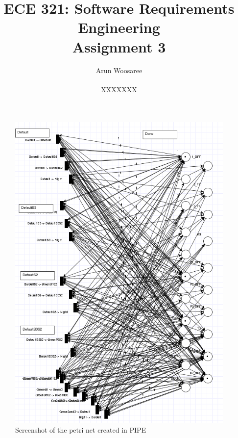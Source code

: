 \documentclass[letterpaper,12pt]{article}
\title{ECE 321: Software Requirements Engineering \\ Assignment 3}
\author{Arun Woosaree \\ \\ XXXXXXX}
\begin{document}
\maketitle

\section{}
\begin{figure}[H]
 \centering
 \includegraphics[width=\textwidth]{petrinet.png}
 \caption{Screenshot of the petri net created in PIPE}
\end{figure}
\end{document}
